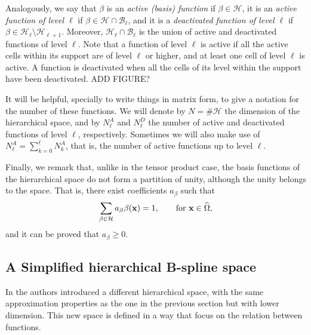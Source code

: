 \documentclass[a4paper]{siamltex1213}
\newcommand{\Rd}{\color{red}}
\newcommand\BB{\mathcal B}
\newcommand\HH{\mathcal H}
\newcommand{\bx}{{\bf x}}
\let\hat\widehat
\begin{document}
Analogously, we say that $\beta$ is an \emph{active (basis) function} if $\beta\in\HH$, it is an \emph{active function of level $\ell$} if $\beta \in \HH \cap \BB_\ell$, and it is a \emph{deactivated function of level $\ell$} if $\beta \in \HH_\ell \setminus \HH_{\ell+1}$. Moreover, $\HH_\ell \cap \BB_\ell$ is the union of active and deactivated functions of level $\ell$. Note that a function of level $\ell$ is active if all the active cells within its support are of level $\ell$ or higher, and at least one cell of level $\ell$ is active. A function is deactivated when all the cells of its level within the support have been deactivated.
{\Rd ADD FIGURE?}

It will be helpful, specially to write things in matrix form, to give a notation for the number of these functions. We will denote by $N= \# \HH$ the dimension of the hierarchical space, and by $N^A_\ell$ and $N^D_\ell$ the number of active and deactivated functions of level $\ell$, respectively. Sometimes we will also make use of {\Rd $N^A_\ell = \sum_{k=0}^\ell N_k^A$}, that is, the number of active functions up to level $\ell$.


Finally, we remark that, unlike in the tensor product case, the basis functions of the hierarchical space do not form a partition of unity, although the unity belongs to the space. That is, there exist coefficients $a_\beta$ such that 
 \begin{equation}\label{E:partition of the unity in the hierarchical space}
\sum_{\beta\in {\HH}} a_\beta \beta (\bx) = 1, \qquad\text{for } \bx \in \hat \Omega,
\end{equation}
and it can be proved that $a_\beta \ge 0$. 


\subsection{A {\Rd Simplified} hierarchical B-spline space} \label{sec:simplified}
In \cite{BG15} the authors introduced a different hierarchical space, with the same approximation properties as the one in the previous section but with lower dimension. This new space is defined in a way that focus on the relation between functions. 
\end{document}
